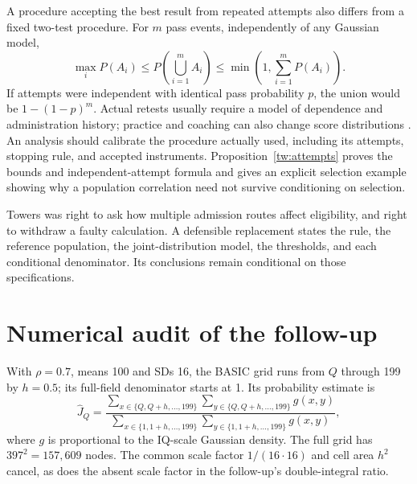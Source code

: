 A procedure accepting the best result from repeated attempts also differs
from a fixed two-test procedure. For \(m\) pass events, independently of
any Gaussian model,
\begin{equation}
\max_i P(A_i)\leq P\!\left(\bigcup_{i=1}^{m}A_i\right)
\leq\min\!\left(1,\sum_{i=1}^{m}P(A_i)\right).
\label{eq:bounds}
\end{equation}
If attempts were independent with identical pass probability \(p\), the
union would be \(1-(1-p)^m\). Actual retests usually require a model of
dependence and administration history; practice and coaching can also
change score distributions \citep{hausknecht2007}. An analysis should
calibrate the procedure actually used, including its attempts, stopping
rule, and accepted instruments.
Proposition~\ref{tw:attempts} proves the bounds and independent-attempt
formula and gives an explicit selection example showing why a population
correlation need not survive conditioning on selection.

Towers was right to ask how multiple admission routes affect eligibility,
and right to withdraw a faulty calculation. A defensible replacement
states the rule, the reference population, the joint-distribution model,
the thresholds, and each conditional denominator. Its conclusions remain
conditional on those specifications.

\appendix
\chapter{Numerical audit of the follow-up}\label{sec:grid}

With \(\rho=0.7\), means 100 and SDs 16, the BASIC grid runs from
\(Q\) through 199 by \(h=0.5\); its full-field denominator starts at 1.
Its probability estimate is
\begin{equation}
\widehat J_Q=
\frac{\displaystyle\sum_{x\in\{Q,Q+h,\ldots,199\}}
\sum_{y\in\{Q,Q+h,\ldots,199\}}g(x,y)}
{\displaystyle\sum_{x\in\{1,1+h,\ldots,199\}}
\sum_{y\in\{1,1+h,\ldots,199\}}g(x,y)},
\label{eq:grid}
\end{equation}
where \(g\) is proportional to the IQ-scale Gaussian density. The full
grid has \(397^2=157{,}609\) nodes. The common scale factor
\(1/(16\cdot16)\) and cell area \(h^2\) cancel, as does the absent scale
factor in the follow-up's double-integral ratio.

